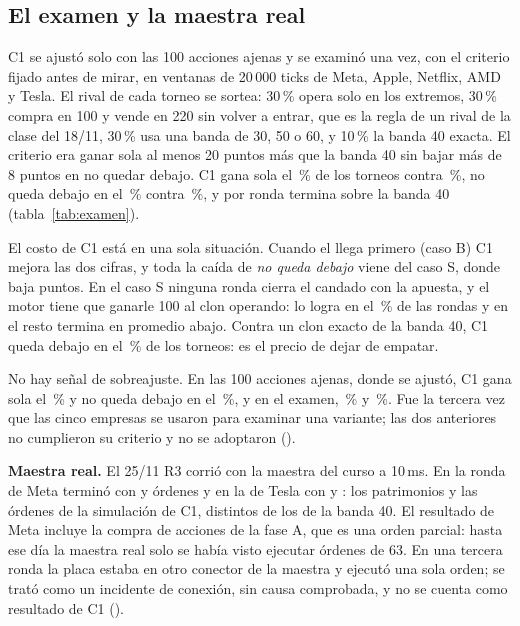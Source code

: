 \subsection{El examen y la maestra real}

C1 se ajustó solo con las 100 acciones ajenas y se examinó una vez, con el criterio fijado antes de mirar, en \ctresExamenVentanas{} ventanas de 20\,000 ticks de Meta, Apple, Netflix, AMD y Tesla. El rival de cada torneo se sortea: 30\,\% opera solo en los extremos, 30\,\% compra en 100 y vende en 220 sin volver a entrar, que es la regla de un rival de la clase del 18/11, 30\,\% usa una banda de 30, 50 o 60, y 10\,\% la banda 40 exacta. El criterio era ganar sola al menos 20 puntos más que la banda 40 sin bajar más de 8 puntos en no quedar debajo. C1 gana sola el \ctresExamenGana\,\% de los torneos contra \ctresExamenGanaBanda\,\%, no queda debajo en el \ctresExamenNd\,\% contra \ctresExamenNdBanda\,\%, y por ronda termina \ctresExamenDifRonda{} sobre la banda 40 (tabla~\ref{tab:examen}).

\begin{table}[H]\centering
\caption{C1 contra la banda 40 sola: el examen y el conjunto donde se ajustó.}\label{tab:examen}

\end{table}

El costo de C1 está en una sola situación. Cuando el \cifraPrecioMax{} llega primero (caso B) C1 mejora las dos cifras, y toda la caída de \emph{no queda debajo} viene del caso S, donde baja \ctresExamenDifNdCasoS{} puntos. En el caso S ninguna ronda cierra el candado con la apuesta, y el motor tiene que ganarle 100 al clon operando: lo logra en el \ctresExamenCandadoCasoS\,\% de las rondas y en el resto termina en promedio \ctresExamenSinRecuperarD{} abajo. Contra un clon exacto de la banda 40, C1 queda debajo en el \ctresExamenDebajoClon\,\% de los torneos: es el precio de dejar de empatar.

No hay señal de sobreajuste. En las 100 acciones ajenas, donde se ajustó, C1 gana sola el \ctresAjenasGana\,\% y no queda debajo en el \ctresAjenasNd\,\%, y en el examen, \ctresExamenGana\,\% y \ctresExamenNd\,\%. Fue la tercera vez que las cinco empresas se usaron para examinar una variante; las dos anteriores no cumplieron su criterio y no se adoptaron ().

\textbf{Maestra real.} El 25/11 R3 corrió con la maestra del curso a 10\,ms. En la ronda de Meta terminó con \ctresPracticaW{} y \ctresPracticaOrdenes{} órdenes y en la de Tesla con \ctresTeslaW{} y \ctresTeslaOrdenes: los patrimonios y las órdenes de la simulación de C1, distintos de los de la banda 40. El resultado de Meta incluye la compra de \ctresApuestaAcciones{} acciones de la fase A, que es una orden parcial: hasta ese día la maestra real solo se había visto ejecutar órdenes de 63. En una tercera ronda la placa estaba en otro conector de la maestra y ejecutó una sola orden; se trató como un incidente de conexión, sin causa comprobada, y no se cuenta como resultado de C1 ().

